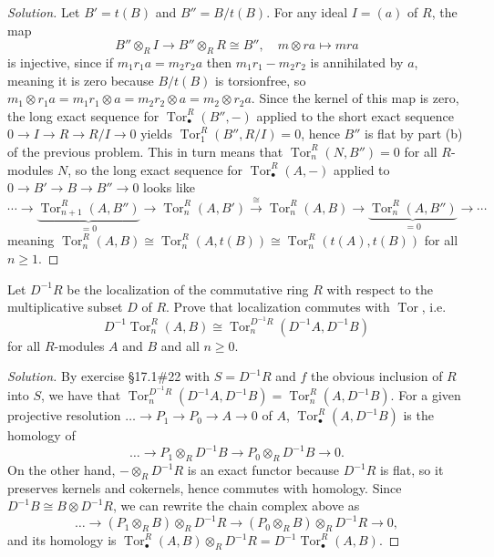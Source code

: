 \documentclass[10pt]{article}
\providecommand{\tensor}{\otimes}
\providecommand{\tor}{\operatorname{Tor}}
\providecommand{\inv}{^{-1}}
\newenvironment{soln}{\begin{proof}[Solution]}{\end{proof}}
\begin{document}
\begin{soln}
    Let $B' = t(B)$ and $B'' = B/t(B)$.
    For any ideal $I = (a)$ of $R$, the map
    \begin{equation*}
        B''\tensor_RI\to B''\tensor_RR\cong B'',\quad
	m\tensor ra\mapsto mra
    \end{equation*}
    is injective, since if $m_1r_1a = m_2r_2a$ then
    $m_1r_1 - m_2r_2$ is annihilated by $a$,
    meaning it is zero because $B/t(B)$ is torsionfree,
    so $m_1\tensor r_1a = m_1r_1\tensor a
    = m_2r_2\tensor a = m_2\tensor r_2a$.
    Since the kernel of this map is zero, the long exact sequence for
    $\tor_\bullet^R(B'',-)$ applied to the short exact sequence
    $0\to I\to R\to R/I\to 0$ yields $\tor_1^R(B'',R/I) = 0$,
    hence $B''$ is flat by part (b) of the previous problem.
    This in turn means that $\tor_n^R(N,B'') = 0$ for all $R$-modules $N$,
    so the long exact sequence for $\tor_\bullet^R(A,-)$
    applied to $0\to B'\to B\to B''\to 0$ looks like
    \begin{equation*}
	\cdots\to\underbrace{\tor_{n+1}^R(A,B'')}_{=0}\to
	\tor_n^R(A,B')\stackrel{\cong}\to\tor_n^R(A,B)
	\to\underbrace{\tor_n^R(A,B'')}_{=0}\to\cdots
    \end{equation*}
    meaning $\tor_n^R(A,B)\cong\tor_n^R(A,t(B))\cong\tor_n^R(t(A),t(B))$
    for all $n \ge 1$.
\end{soln}

\pagebreak
\begin{problem}
    [\S17.1\#23]
    Let $D\inv R$ be the localization of the commutative ring $R$
    with respect to the multiplicative subset $D$ of $R$.
    Prove that localization commutes with $\tor$, i.e.
    \[
	D\inv\tor_n^R(A,B)\cong\tor_n^{D\inv R}(D\inv A,D\inv B)
    \]
    for all $R$-modules $A$ and $B$ and all $n\ge 0$.
\end{problem}

\begin{soln}
    By exercise \S17.1\#22 with $S = D\inv R$
    and $f$ the obvious inclusion of $R$ into $S$, we have that
    $\tor_n^{D\inv R}(D\inv A,D\inv B) = \tor_n^R(A,D\inv B)$.
    For a given projective resolution $\dots\to P_1\to P_0\to A\to 0$
    of $A$, $\tor_\bullet^R(A,D\inv B)$ is the homology of
    \begin{equation*}
        \dots\to P_1\tensor_R D\inv B
	\to P_0\tensor_R D\inv B
	\to 0.
    \end{equation*}
    On the other hand, $-\tensor_RD\inv R$ is an exact functor
    because $D\inv R$ is flat, so it preserves
    kernels and cokernels, hence commutes with homology.
    Since $D\inv B\cong B\tensor D\inv R$,
    we can rewrite the chain complex above as
    \begin{equation*}
        \dots\to(P_1\tensor_R B)\tensor_RD\inv R
	\to(P_0\tensor_R B)\tensor_RD\inv R
	\to 0,
    \end{equation*}
    and its homology is
    $\tor_\bullet^R(A,B)\tensor_RD\inv R
    = D\inv\tor_\bullet^R(A,B)$.
\end{soln}
\end{document}
